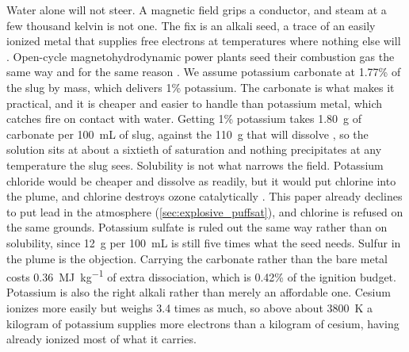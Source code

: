 \documentclass{article}
\begin{document}
Water alone will not steer. A magnetic field grips a conductor, and steam at a few thousand kelvin is not one. The fix is an alkali seed, a trace of an easily ionized metal that supplies free electrons at temperatures where nothing else will \cite{kerrebrock1964nonequilibrium}. Open-cycle magnetohydrodynamic power plants seed their combustion gas the same way and for the same reason \cite{rosa1968mhd, messerle1995mhd}. We assume potassium carbonate at 1.77\% of the slug by mass, which delivers 1\% potassium. The carbonate is what makes it practical, and it is cheaper and easier to handle than potassium metal, which catches fire on contact with water. Getting 1\% potassium takes \SI{1.80}{\gram} of carbonate per \SI{100}{\milli\liter} of slug, against the \SI{110}{\gram} that will dissolve \cite{crc_handbook}, so the solution sits at about a sixtieth of saturation and nothing precipitates at any temperature the slug sees. Solubility is not what narrows the field. Potassium chloride would be cheaper and dissolve as readily, but it would put chlorine into the plume, and chlorine destroys ozone catalytically \cite{molina1974ozone}. This paper already declines to put lead in the atmosphere (\autoref{sec:explosive_puffsat}), and chlorine is refused on the same grounds. Potassium sulfate is ruled out the same way rather than on solubility, since \SI{12}{\gram} per \SI{100}{\milli\liter} is still five times what the seed needs. Sulfur in the plume is the objection. Carrying the carbonate rather than the bare metal costs \SI{0.36}{\mega\joule\per\kilogram} of extra dissociation, which is 0.42\% of the ignition budget. Potassium is also the right alkali rather than merely an affordable one. Cesium ionizes more easily but weighs 3.4 times as much, so above about \SI{3800}{\kelvin} a kilogram of potassium supplies more electrons than a kilogram of cesium, having already ionized most of what it carries.
\end{document}
